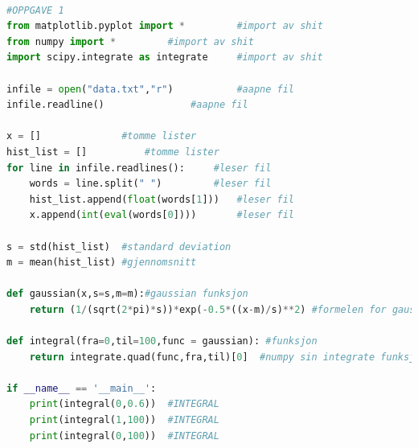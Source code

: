 \begin{lstlisting}[language=python]

#OPPGAVE 1
from matplotlib.pyplot import *			#import av shit
from numpy import *			#import av shit
import scipy.integrate as integrate		#import av shit

infile = open("data.txt","r")			#aapne fil
infile.readline()				#aapne fil

x = []				#tomme lister
hist_list = []			#tomme lister
for line in infile.readlines():		#leser fil
	words = line.split(" ")			#leser fil
	hist_list.append(float(words[1]))	#leser fil
	x.append(int(eval(words[0])))		#leser fil

s = std(hist_list) 	#standard deviation
m = mean(hist_list) #gjennomsnitt

def gaussian(x,s=s,m=m):#gaussian funksjon
	return (1/(sqrt(2*pi)*s))*exp(-0.5*((x-m)/s)**2) #formelen for gaussianfordeling

def integral(fra=0,til=100,func = gaussian): #funksjon
	return integrate.quad(func,fra,til)[0]	#numpy sin integrate funksjon

if __name__ == '__main__':
	print(integral(0,0.6))	#INTEGRAL
	print(integral(1,100))	#INTEGRAL
	print(integral(0,100))	#INTEGRAL
\end{lstlisting}








